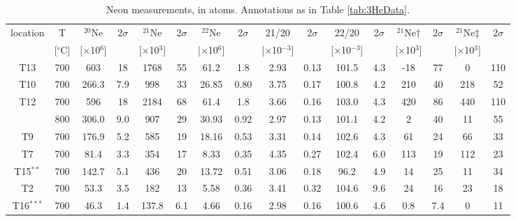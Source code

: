 \documentclass{article}
\begin{document}
\clearpage
\begin{table}[htbp]
  \centering
\begin{tabular}{cccccccccccccccc}
  location &     T &  $^{20}$Ne &   2$\sigma$ &  $^{21}$Ne &   2$\sigma$ &  $^{22}$Ne &   2$\sigma$ & 21/20 &   2$\sigma$ & 22/20 &   2$\sigma$ & $^{21}$Ne$\dagger$ &   2$\sigma$ &     $^{21}$Ne$\ddagger$ &   2$\sigma$ \\
           &   [$^{\circ}$C]    &     [$\times$10$^6$] &      &    [$\times$10$^3$] &     &     [$\times$10$^6$] &   &    [$\times$10$^{-3}$] &   &    [$\times$10$^{-3}$] &   &    [$\times$10$^3$] &   &    [$\times$10$^3$] &  \\
\hline
\hline
T13 &   700 & 603 &  18 &  1768 &    55 & 61.2 &  1.8 &  2.93 &  0.13 & 101.5 &   4.3 & -18 &  77 &     0 & 110 \\
\hline
T10 &   700 & 266.3 &   7.9 &   998 &    33 & 26.85 &  0.80 &  3.75 &  0.17 & 100.8 &   4.2 & 210 &  40 & 218 &  52 \\
\hline
T12 &   700 & 596 &  18 &  2184 &    68 & 61.4 &  1.8 &  3.66 &  0.16 & 103.0 &   4.3 & 420 &  86 & 440 & 110 \\
           &   800 & 306.0 &   9.0 &   907 &    29 & 30.93 &  0.92 &  2.97 &  0.13 & 101.1 &   4.2 &   2 &  40 &  11 &  55 \\
\hline
T9 &   700 & 176.9 &   5.2 &   585 &    19 & 18.16 &  0.53 &  3.31 &  0.14 & 102.6 &   4.3 &  61 &  24 &  66 &  33 \\
\hline
T7 &   700 &  81.4 &   3.3 &   354 &    17 &  8.33 &  0.35 &  4.35 &  0.27 & 102.4 &   6.0 & 113 &  19 & 112 &  23 \\
\hline
T15$^{**}$ &   700 & 142.7 &   5.1 &   436 &    20 & 13.72 &  0.51 &  3.06 &  0.18 &  96.2 &   4.9 &  14 &  25 &  11 &  34 \\
\hline
T2 &   700 &  53.3 &   3.5 &   182 &    13 &  5.58 &  0.36 &  3.41 &  0.32 & 104.6 &   9.6 &  24 &  16 &  23 &  18 \\
\hline
T16$^{***}$ &   700 &  46.3 &   1.4 &   137.8 &     6.1 &  4.66 &  0.16 &  2.98 &  0.16 & 100.6 &   4.6 &   0.8 &   7.4 &     0 &  11 \\
\end{tabular}
\caption{Neon measurements, in atoms. Annotations as in Table \ref{tab:3HeData}.}
\label{tab:21NeData}
\end{table}
\end{document}
